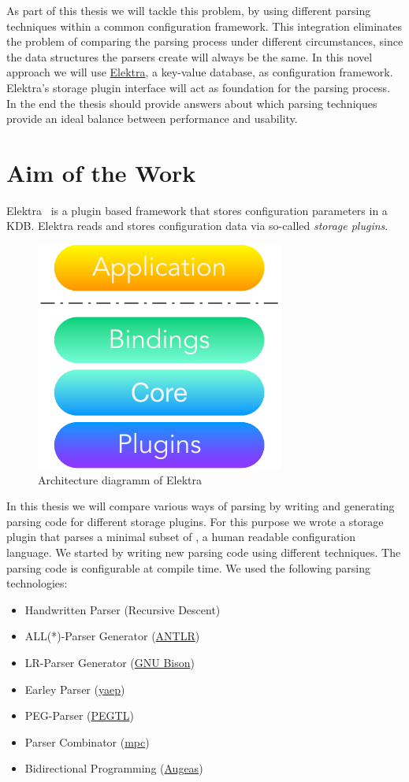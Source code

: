 As part of this thesis we will tackle this problem, by using different parsing techniques within a common configuration framework. This integration eliminates the problem of comparing the parsing process under different circumstances, since the data structures the parsers create will always be the same. In this novel approach we will use \href{http://web.libelektra.org}{Elektra}, a key-value database, as configuration framework. Elektra’s storage plugin interface will act as foundation for the parsing process. In the end the thesis should provide answers about which parsing techniques provide an ideal balance between performance and usability.

\section{Aim of the Work}
\label{sec:Aim_Of_The_Work}

Elektra~\cite{raab2010modular} is a plugin based framework that stores configuration parameters in a \glsdesc{KDB}. Elektra reads and stores configuration data via so-called \emph{storage plugins}.

\begin{figure}[H]
  \centering
    \includegraphics[width=.3\textwidth]{Figures/Elektra.pdf}
  \caption{Architecture diagramm of Elektra}
\end{figure}

In this thesis we will compare various ways of parsing by writing and generating parsing code for different storage plugins. For this purpose we wrote a storage plugin that parses a minimal subset of , a human readable configuration language. We started by writing new parsing code using different techniques. The parsing code is configurable at compile time. We used the following parsing technologies:

\begin{itemize}
  \item Handwritten Parser (Recursive Descent)
  \item ALL(*)-Parser Generator (\href{http://www.antlr.org}{ANTLR})
  \item LR-Parser Generator (\href{https://www.gnu.org/software/bison}{GNU Bison})
  \item Earley Parser (\href{https://github.com/vnmakarov/yaep}{yaep})
  \item PEG-Parser (\href{https://github.com/ColinH/PEGTL}{PEGTL})
  \item Parser Combinator (\href{https://github.com/orangeduck/mpc}{mpc})
  \item Bidirectional Programming (\href{http://augeas.net}{Augeas})
\end{itemize}

